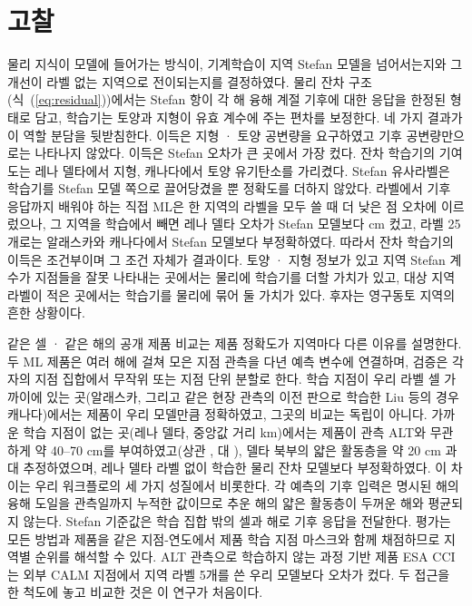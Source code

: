 \section{고찰}\label{sec:discussion}

물리 지식이 모델에 들어가는 방식이, 기계학습이 지역 Stefan 모델을 넘어서는지와 그 개선이 라벨 없는 지역으로 전이되는지를 결정하였다. 물리 잔차 구조(식~(\ref{eq:residual}))에서는 Stefan 항이 각 해 융해 계절 기후에 대한 응답을 한정된 형태로 담고, 학습기는 토양과 지형이 유효 계수에 주는 편차를 보정한다. 네 가지 결과가 이 역할 분담을 뒷받침한다. 이득은 지형 · 토양 공변량을 요구하였고 기후 공변량만으로는 나타나지 않았다. 이득은 Stefan 오차가 큰 곳에서 가장 컸다. 잔차 학습기의 기여도는 레나 델타에서 지형, 캐나다에서 토양 유기탄소를 가리켰다. Stefan 유사라벨은 학습기를 Stefan 모델 쪽으로 끌어당겼을 뿐 정확도를 더하지 않았다. 라벨에서 기후 응답까지 배워야 하는 직접 ML은 한 지역의 라벨을 모두 쓸 때 더 낮은 점 오차에 이르렀으나, 그 지역을 학습에서 빼면 레나 델타 오차가 Stefan 모델보다 \ndrefLeregDzabs{} cm 컸고, 라벨 25개로는 알래스카와 캐나다에서 Stefan 모델보다 부정확하였다. 따라서 잔차 학습기의 이득은 조건부이며 그 조건 자체가 결과이다. 토양 · 지형 정보가 있고 지역 Stefan 계수가 지점들을 잘못 나타내는 곳에서는 물리에 학습기를 더할 가치가 있고, 대상 지역 라벨이 적은 곳에서는 학습기를 물리에 묶어 둘 가치가 있다. 후자는 영구동토 지역의 흔한 상황이다.

같은 셀 · 같은 해의 공개 제품 비교는 제품 정확도가 지역마다 다른 이유를 설명한다. 두 ML 제품은 여러 해에 걸쳐 모은 지점 관측을 다년 예측 변수에 연결하며, 검증은 각자의 지점 집합에서 무작위 또는 지점 단위 분할로 한다\cite{Liu2024,Wei2026}. 학습 지점이 우리 라벨 셀 가까이에 있는 곳(알래스카, 그리고 같은 현장 관측의 이전 판으로 학습한 Liu 등의 경우 캐나다)에서는 제품이 우리 모델만큼 정확하였고, 그곳의 비교는 독립이 아니다. 가까운 학습 지점이 없는 곳(레나 델타, 중앙값 거리 \ndistweiLemed{} km)에서는 제품이 관측 ALT와 무관하게 약 40--70 cm를 부여하였고(상관 \nrLeWei{}, \nrLeLiu{} 대 \nrLeRo), 델타 북부의 얇은 활동층을 약 20 cm 과대 추정하였으며, 레나 델타 라벨 없이 학습한 물리 잔차 모델보다 부정확하였다. 이 차이는 우리 워크플로의 세 가지 성질에서 비롯한다. 각 예측의 기후 입력은 명시된 해의 융해 도일을 관측일까지 누적한 값이므로 추운 해의 얇은 활동층이 두꺼운 해와 평균되지 않는다. Stefan 기준값은 학습 집합 밖의 셀과 해로 기후 응답을 전달한다. 평가는 모든 방법과 제품을 같은 지점-연도에서 제품 학습 지점 마스크와 함께 채점하므로 지역별 순위를 해석할 수 있다. ALT 관측으로 학습하지 않는 과정 기반 제품 ESA CCI는 외부 CALM 지점에서 지역 라벨 5개를 쓴 우리 모델보다 오차가 컸다. 두 접근을 한 척도에 놓고 비교한 것은 이 연구가 처음이다.


